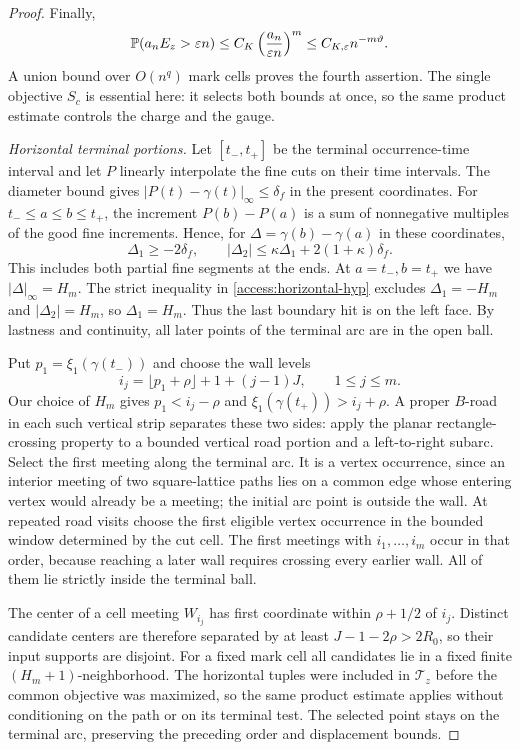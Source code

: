 \begin{proof}
Finally,
\[
 \mathbb P(a_nE_z>\varepsilon n)
 \le C_K\left(\frac{a_n}{\varepsilon n}\right)^m
 \le C_{K,\varepsilon}n^{-m\vartheta}.
\]
A union bound over $O(n^q)$ mark cells proves the fourth assertion.
The single objective $S_c$ is essential here: it selects both bounds at
once, so the same product estimate controls the charge and the gauge.

\emph{Horizontal terminal portions.}
Let $[t_-,t_+]$ be the terminal occurrence-time interval and let $P$
linearly interpolate the fine cuts on their time intervals. The diameter
bound gives $|P(t)-\gamma(t)|_\infty\le\delta_f$ in the present
coordinates. For $t_-\le a\le b\le t_+$, the increment $P(b)-P(a)$
is a sum of nonnegative multiples of the good fine increments. Hence,
for $\Delta=\gamma(b)-\gamma(a)$ in these coordinates,
\begin{equation}\label{access:horizontal-submotion}
 \Delta_1\ge-2\delta_f,\qquad
 |\Delta_2|\le\kappa\Delta_1+2(1+\kappa)\delta_f.
\end{equation}
This includes both partial fine segments at the ends. At
$a=t_-,b=t_+$ we have $|\Delta|_\infty=H_m$.
The strict inequality in \eqref{access:horizontal-hyp} excludes
$\Delta_1=-H_m$ and $|\Delta_2|=H_m$, so $\Delta_1=H_m$.
Thus the last boundary hit is on the left face. By lastness and
continuity, all later points of the terminal arc are in the open ball.

Put $p_1=\xi_1(\gamma(t_-))$ and choose the wall levels
\[
 i_j=\lfloor p_1+\rho\rfloor+1+(j-1)J,\qquad 1\le j\le m.
\]
Our choice of $H_m$ gives
$p_1<i_j-\rho$ and $\xi_1(\gamma(t_+))>i_j+\rho$.
A proper $B$-road in each such vertical strip separates these two
sides: apply the planar rectangle-crossing property to a bounded
vertical road portion and a left-to-right subarc. Select the first
meeting along the terminal arc. It is a vertex occurrence, since an
interior meeting of two square-lattice paths lies on a common edge
whose entering vertex would already be a meeting; the initial arc
point is outside the wall. At repeated road visits choose the first
eligible vertex occurrence in the bounded window determined by the
cut cell. The first meetings with $i_1,\ldots,i_m$ occur in that order,
because reaching a later wall requires crossing every earlier wall.
All of them lie strictly inside the terminal ball.

The center of a cell meeting $W_{i_j}$ has first coordinate within
$\rho+1/2$ of $i_j$. Distinct candidate centers are therefore separated
by at least $J-1-2\rho>2R_0$, so their input supports are disjoint.
For a fixed mark cell all candidates lie in a fixed finite
$(H_m+1)$-neighborhood. The horizontal tuples were included in
$\mathcal T_z$ before the common objective was maximized, so the same
product estimate applies without conditioning on the path or on its
terminal test. The selected point stays on the terminal arc, preserving
the preceding order and displacement bounds.
\end{proof}

